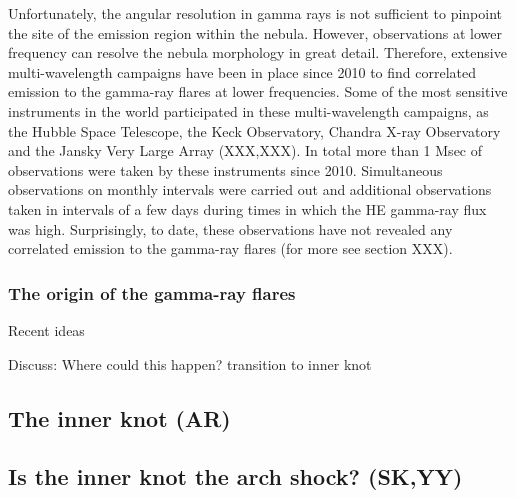 Unfortunately, the angular resolution in gamma rays is not sufficient to pinpoint the site of the emission region within the nebula. However, observations at lower frequency can resolve the nebula morphology in great detail. Therefore, extensive multi-wavelength campaigns have been in place since 2010 to find correlated emission to the gamma-ray flares at lower frequencies. Some of the most sensitive instruments in the world participated in these multi-wavelength campaigns, as the Hubble Space Telescope, the Keck Observatory, Chandra X-ray Observatory and the Jansky Very Large Array (XXX,XXX). In total more than 1 Msec of observations were taken by these  instruments since 2010. Simultaneous observations on monthly intervals were carried out and additional observations taken in intervals of a few days during times in which the HE gamma-ray flux was high. Surprisingly, to date, these observations have not revealed any correlated emission to the gamma-ray flares (for more see section XXX). 

\subsubsection{The origin of the gamma-ray flares}

Recent ideas  \cite{2016arXiv160403179Y}\cite{2015arXiv151205426Z}\cite{2016arXiv160304850N}\cite{2016arXiv160305731L}

Discuss: Where could this happen? transition to inner knot

\subsection{The inner knot   (AR)}
\subsection{Is the inner knot the arch shock?                                      (SK,YY)}
